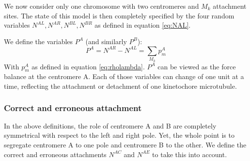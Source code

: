 \documentclass[a4paper,12pt]{article}
\begin{document}
We now consider only one chromosome with two centromeres and $M_k$
attachment sites. The state of this model is then completely specified
by the four random variables $N^{AL}, N^{AR}, N^{BL}, N^{BR}$ as
defined in equation \ref{eq:NAL}.  

We define the variables $P^A$ (and similarly $P^B$):
\begin{equation}
  \label{eq:PA}
  P^A = N^{AR} - N^{AL} = \sum_{M_k} p_m^A
\end{equation}
With $p_m^A$ as defined in equation \ref{eq:rholambda}. $P^A$ can be
viewed as the force balance at the centromere A. Each of those
variables can change of one unit at a time, reflecting the attachment
or detachment of one kinetochore microtubule.

\subsubsection{Correct and erroneous attachment}

In the above definitions, the role of centromere A and B are
completely symmetrical with respect to the left and right pole. Yet,
the whole point is to segregate centromere A to one pole and
centromere B to the other. We define the correct and erroneous
attachments $N^{AC}$ and $N^{AE}$ to take this into account.
\end{document}
